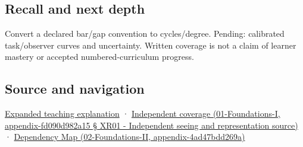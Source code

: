 \subsection{Recall and next depth}\label{recall-and-next-depth}

Convert a declared bar/gap convention to cycles/degree. Pending: calibrated task/observer curves and uncertainty. Written coverage is not a claim of learner mastery or accepted numbered-curriculum progress.

\subsection{Source and navigation}\label{source-and-navigation}

\href{Continuous\%20Notes/University\%20-\%20Worlds,\%20Images\%20and\%20Inference\%20-\%20Graphics,\%20Vision\%20and\%20Photography\#Visibility\%20is\%20about\%20contrast,\%20conditions\%20and\%20tasks}{Expanded teaching explanation} · \href{}{Independent coverage (01-Foundations-I, appendix-fd090d982a15 § XR01 - Independent seeing and representation source)} · \href{}{Dependency Map (02-Foundations-II, appendix-4ad47bdd269a)}
